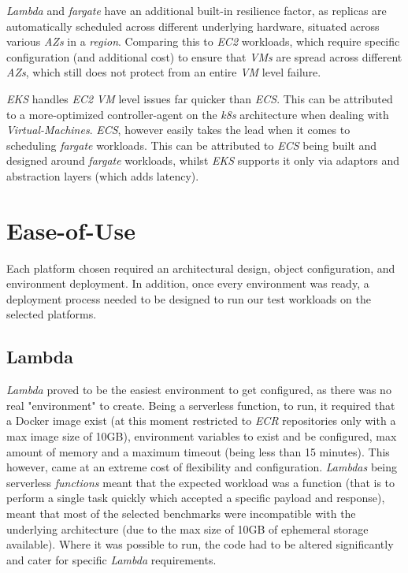 \textit{Lambda} and \textit{fargate} have an additional built-in resilience factor, as replicas are automatically scheduled across different underlying hardware, situated across various \textit{AZs} in a \textit{region}.
Comparing this to \textit{EC2} workloads, which require specific configuration (and additional cost) to ensure that \textit{VMs} are spread across different \textit{AZs},
which still does not protect from an entire \textit{VM} level failure.

\textit{EKS} handles \textit{EC2} \textit{VM} level issues far quicker than \textit{ECS}. This can be attributed to a more-optimized controller-agent on the \textit{k8s} architecture when dealing with \textit{Virtual-Machines}.
\textit{ECS}, however easily takes the lead when it comes to scheduling \textit{fargate} workloads. This can be attributed to \textit{ECS} being built and designed around \textit{fargate} workloads, whilst \textit{EKS}
supports it only via adaptors and abstraction layers (which adds latency).


\section{Ease-of-Use}
Each platform chosen required an architectural design, object configuration, and environment deployment.
In addition, once every environment was ready, a deployment process needed to be designed to run our test workloads on the selected platforms.

\subsection{Lambda}
\textit{Lambda} proved to be the easiest environment to get configured, as there was no real "environment" to create. Being a serverless function,
to run, it required that a Docker image exist (at this moment restricted to \textit{ECR} repositories only with a max image size of 10GB), environment variables to exist and be configured, max amount of memory
and a maximum timeout (being less than 15 minutes). This however, came at an extreme cost of flexibility and configuration.
\textit{Lambdas} being serverless \emph{functions} meant that the expected workload was a function (that is to perform a single task quickly which accepted a specific payload and response),
meant that most of the selected benchmarks were incompatible with the underlying architecture (due to the max size of 10GB of ephemeral storage available).
Where it was possible to run, the code had to be altered significantly and cater for specific \textit{Lambda} requirements.

